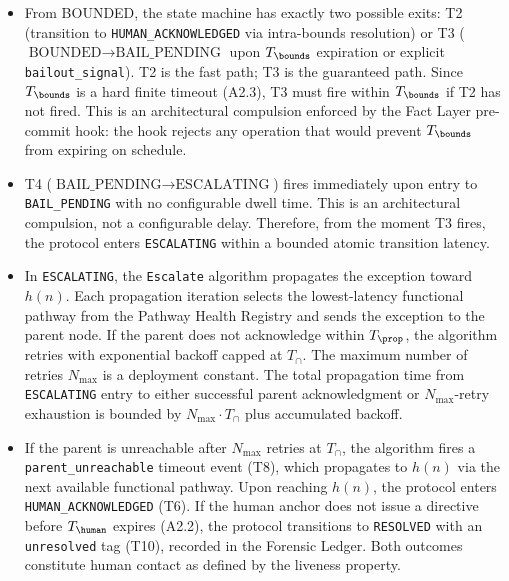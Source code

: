 \begin{itemize}
\item[\textbf{Step 1.}] From BOUNDED, the state machine has exactly two possible exits: T2 (transition to \texttt{HUMAN\_ACKNOWLEDGED} via intra-bounds resolution) or T3 ($\text{BOUNDED} \rightarrow \text{BAIL\_PENDING}$ upon $T_{\bounds}$ expiration or explicit \texttt{bailout\_signal}). T2 is the fast path; T3 is the guaranteed path. Since $T_{\bounds}$ is a hard finite timeout (A2.3), T3 must fire within $T_{\bounds}$ if T2 has not fired. This is an architectural compulsion enforced by the Fact Layer pre-commit hook: the hook rejects any operation that would prevent $T_{\bounds}$ from expiring on schedule.

\item[\textbf{Step 2.}] T4 ($\text{BAIL\_PENDING} \rightarrow \text{ESCALATING}$) fires immediately upon entry to \texttt{BAIL\_PENDING} with no configurable dwell time. This is an architectural compulsion, not a configurable delay. Therefore, from the moment T3 fires, the protocol enters \texttt{ESCALATING} within a bounded atomic transition latency.

\item[\textbf{Step 3.}] In \texttt{ESCALATING}, the \texttt{Escalate} algorithm propagates the exception toward $h(n)$. Each propagation iteration selects the lowest-latency functional pathway from the Pathway Health Registry and sends the exception to the parent node. If the parent does not acknowledge within $T_{\prop}$, the algorithm retries with exponential backoff capped at $T_{\cap}$. The maximum number of retries $N_{\max}$ is a deployment constant. The total propagation time from \texttt{ESCALATING} entry to either successful parent acknowledgment or $N_{\max}$-retry exhaustion is bounded by $N_{\max} \cdot T_{\cap}$ plus accumulated backoff.

\item[\textbf{Step 4.}] If the parent is unreachable after $N_{\max}$ retries at $T_{\cap}$, the algorithm fires a \texttt{parent\_unreachable} timeout event (T8), which propagates to $h(n)$ via the next available functional pathway. Upon reaching $h(n)$, the protocol enters \texttt{HUMAN\_ACKNOWLEDGED} (T6). If the human anchor does not issue a directive before $T_{\human}$ expires (A2.2), the protocol transitions to \texttt{RESOLVED} with an \texttt{unresolved} tag (T10), recorded in the Forensic Ledger. Both outcomes constitute human contact as defined by the liveness property.
\end{itemize}

